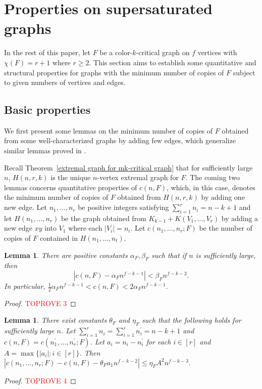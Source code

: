 \documentclass[10pt]{article}
\newtheorem{lemma}[theorem]{Lemma}
\begin{document}
\section{Properties on supersaturated graphs}\label{sec_properties-of-H}
In the rest of this paper, let $F$ be a color-$k$-critical graph on $f$ vertices with $\chi(F)=r+1$ where $r\geq 2$.
This section aims to establish some quantitative and structural properties for graphs with the minimum number of copies of $F$ subject to given numbers of vertices and edges.

\subsection{Basic properties}
We first present some lemmas on the minimum number of copies of $F$ obtained from some well-characterized graphs by adding few edges,
which generalize similar lemmas proved in \cite{mubayi2010, pikhurko2017}.

Recall Theorem~\ref{extremal graph for mk-critical graph} that for sufficiently large $n$,
$H(n,r,k)$ is the unique $n$-vertex extremal graph for $F$.
The coming two lemmas concerns quantitative properties of $c(n,F)$,
which, in this case, denotes the minimum number of copies of $F$ obtained from $H(n,r,k)$ by adding one new edge.
Let $n_1,\ldots, n_r$ be positive integers satisfying $\sum_{i=1}^r n_i=n-k+1$ and
let $H(n_1,\ldots, n_r)$ be the graph obtained from $K_{k-1}+K(V_1,\ldots,V_r)$ by adding a new edge $xy$ into $V_1$ where each $|V_i|=n_i$.
Let $c(n_1,\ldots,n_r;F)$ be the number of copies of $F$ contained in $H(n_1,\ldots, n_t)$.

\begin{lemma}\label{counting F in H(n,p,k) with adding an edge}
There are positive constants $\alpha_F,\beta_F$ such that if $n$ is sufficiently large, then
$$|c(n,F)-\alpha_F n^{f-k-1}|<\beta_F n ^{f-k-2}.$$
In particular, $\frac{1}{2}\alpha_F n^{f-k-1} <c(n,F)<2\alpha_F n^{f-k-1}.$
\end{lemma}
\begin{proof}\textcolor{red}{TOPROVE 3}\end{proof}

\begin{lemma}\label{estimate c(n,f)}
There exist constants $\theta_F$ and $\eta_F$ such that the following holds for sufficiently large $n$.
Let $\sum_{i=1}^rn_i=\sum_{i=1}^{r}n^\prime_i=n-k+1$ and $c(n,F)=c(n^\prime_1,\ldots,n^\prime_r;F)$.
Let $a_i=n_i-n^\prime_i$ for each $i\in [r]$ and $A=\max\{|a_i|: i\in [r]\}$. Then
$|c(n_1,\ldots,n_r;F)-c(n,F)-\theta_F a_1 n^{f-k-2}|\leq \eta_F A^2 n^{f-k-3}.$
\end{lemma}
\begin{proof}\textcolor{red}{TOPROVE 4}\end{proof}
\end{document}
